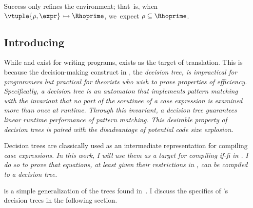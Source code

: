 \documentclass[manuscript,screen,review, 12pt, nonacm]{acmart}
\begin{document}
    \medskip
        
    Success only refines the environment; that~is, when ${\vtuple{\rho, \expr}}
    \rightarrowtail{} {\Rhoprime}$, we~expect $\rho \subseteq \Rhoprime$.
    
    \vfilbreak

\vmsemantics

\subsection{Introducing \D}
\label{d}

While \PPlus and \VMinus exist for writing programs, \D exists as the target
of translation. This is because the decision-making construct in \D, the
\it{decision tree}, is impractical for programmers but practical for theorists
who wish to prove properties of efficiency. Specifically, a decision tree is an
automaton that implements pattern matching with the invariant that no part of
the scrutinee of a \it{case} expression is examined more than once at runtime.
Through this invariant, a decision tree guarantees linear runtime performance of
pattern matching. This desirable property of decision trees is paired with the
disadvantage of potential code size explosion. 

Decision trees are classically used as an intermediate representation for
compiling \it{case} expressions. In this work, I will use them as a target for
compiling \it{if-fi} in \VMinus. I do so to prove that equations, at least given
their restrictions in \VMinus, can be compiled to a decision tree. 

\D is a simple generalization of the trees found in~\citet{maranget}. I discuss
the specifics of \D's decision trees in the following section. 
\end{document}
